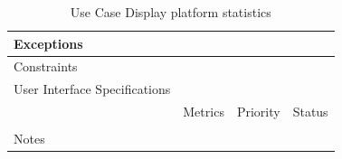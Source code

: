 \begin{table}[H]
\begin{tabularx}{\linewidth}{|l|X|X|X|}
            \hline Exceptions                    & \multicolumn{3}{l|}{}                                                                                 \\

            \hline Constraints                   & \multicolumn{3}{l|}{}                                                                                 \\

            \hline User Interface Specifications & \multicolumn{3}{l|}{}                                                                                 \\

            \hline \multirow{2}{*}{}             & Metrics                                                                           & Priority & Status \\
            \cline{2-4}                          &                                                                                   &          &        \\
            \hline Notes                         & \multicolumn{3}{l|}{}                                                                                 \\
            \hline
      \end{tabularx}
      \caption{Use Case Display platform statistics}
      \label{tab:use_case_display_platform_statistics}
\end{table}


